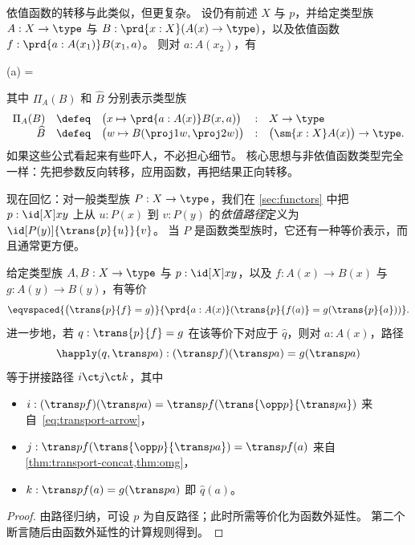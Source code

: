 %
依值函数的转移与此类似，但更复杂。
设仍有前述 $X$ 与 $p$，并给定类型族 $A:X\to \type$ 与 $B:\prd{x:X} (A(x)\to\type)$，以及依值函数 $f : \prd{a:A(x_1)} B(x_1,a)$。
则对 $a:A(x_2)$，有
\begin{narrowmultline*}
  (a) = \narrowbreak
\end{narrowmultline*}
其中 $\Pi_A(B)$ 和 $\widehat{B}$ 分别表示类型族
\begin{equation}\label{eq:transport-arrow-families}
\begin{array}{rclcl}
\Pi_A(B) &\defeq& \big(x\mapsto \prd{a:A(x)} B(x,a) \big) &:& X\to \type\\
\widehat{B} &\defeq& \big(w \mapsto B(\proj1w,\proj2w) \big) &:& \big(\sm{x:X} A(x)\big) \to \type.
\end{array}
\end{equation}
如果这些公式看起来有些吓人，不必担心细节。
核心思想与非依值函数类型完全一样：先把参数反向转移，应用函数，再把结果正向转移。

现在回忆：对一般类型族 $P:X\to\type$，我们在 \cref{sec:functors} 中把 $p:\id[X]xy$ 上从 $u:P(x)$ 到 $v:P(y)$ 的\emph{依值路径}定义为 $\id[P(y)]{\trans{p}{u}}{v}$。
当 $P$ 是函数类型族时，它还有一种等价表示，而且通常更方便。

\begin{lem}\label{thm:dpath-arrow}
  给定类型族 $A,B:X\to\type$ 与 $p:\id[X]xy$，以及 $f:A(x)\to B(x)$ 与 $g:A(y)\to B(y)$，有等价
  \[ \eqvspaced{ \big(\trans{p}{f} = {g}\big) } { \prd{a:A(x)}  (\trans{p}{f(a)} = g(\trans{p}{a})) }. \]
  进一步地，若 $q:\trans{p}{f} = {g}$ 在该等价下对应于 $\widehat q$，则对 $a:A(x)$，路径
  \[ \happly(q,\trans p a) : (\trans p f)(\trans p a) = g(\trans p a)\]
  等于拼接路径 $i\ct j\ct k$，其中
  \begin{itemize}
  \item $i:(\trans p f)(\trans p a) = \trans p {f (\trans {\opp p}{\trans p a})}$ 来自~\eqref{eq:transport-arrow}，
  \item $j:\trans p {f (\trans {\opp p}{\trans p a})} = \trans p {f(a)}$ 来自 \cref{thm:transport-concat,thm:omg}，
  \item $k:\trans p {f(a)}= g(\trans p a)$ 即 $\widehat{q}(a)$。
  \end{itemize}
\end{lem}
\begin{proof}
  由路径归纳，可设 $p$ 为自反路径；此时所需等价化为函数外延性。
  第二个断言随后由函数外延性的计算规则得到。
\end{proof}


